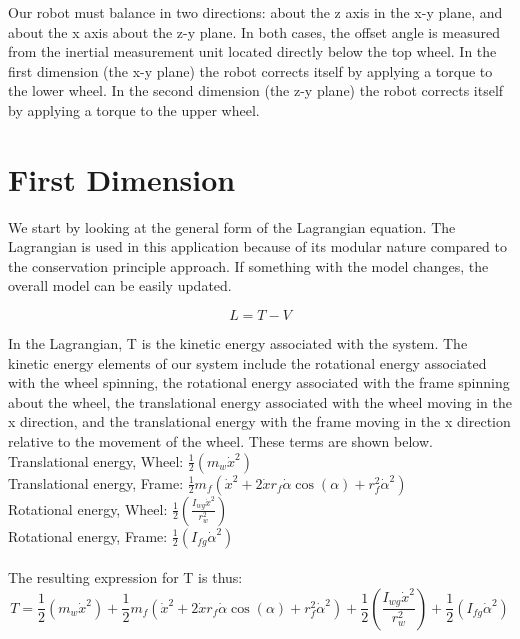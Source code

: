 \documentclass{article}
\begin{document}
Our robot must balance in two directions: about the z axis in the x-y plane, and about the x axis about the z-y plane.    In both cases, the offset angle is measured from the inertial measurement unit located directly below the top wheel.  In the first dimension (the x-y plane) the robot corrects itself by applying a torque to the lower wheel.  In the second dimension (the z-y plane) the robot corrects itself by applying a torque to the upper wheel.

\section{First Dimension}
We start by looking at the general form of the Lagrangian equation.  The Lagrangian is used in this application because of its modular nature compared to the conservation principle approach.  If something with the model changes, the overall model can be easily updated.




\begin{equation}
 L = T - V 
 \end{equation}
 
 In the Lagrangian, T is the kinetic energy associated with the system. The kinetic energy elements of our system include the rotational energy associated with the wheel spinning, the rotational energy associated with the frame spinning about the wheel, the translational energy associated with the wheel moving in the x direction, and the translational energy with the frame moving in the x direction relative to the movement of the wheel.  These terms are shown below. \\
 
Translational energy, Wheel:
$\frac{1}{2} (m_{w} \dot{x}^2)$ \\

Translational energy, Frame: $\frac{1}{2} m_{f} (\dot{x}^2 + 2 \dot{x} r_{f} \dot{\alpha} \cos(\alpha)   + r_{f}^2 \dot{\alpha}^2)
$ \\

Rotational energy, Wheel:
$
\frac{1}{2} \left(   \frac{I_{wg} \dot{x}^2}     {r_{w}^2  } \right)
$ \\

Rotational energy, Frame:
$
\frac{1}{2} (I_{fg} \dot{\alpha}^2 )
$ \\ \\

The resulting expression for T is thus:
\begin{equation}
T = \frac{1}{2} (m_{w} \dot{x}^2) + \frac{1}{2} m_{f} (\dot{x}^2 + 2 \dot{x} r_{f} \dot{\alpha} \cos(\alpha)   + r_{f}^2 \dot{\alpha}^2)  + \frac{1}{2} \left(   \frac{I_{wg} \dot{x}^2}     {r_{w}^2  } \right) + \frac{1}{2} (I_{fg} \dot{\alpha}^2 )
\end{equation}
\end{document}

